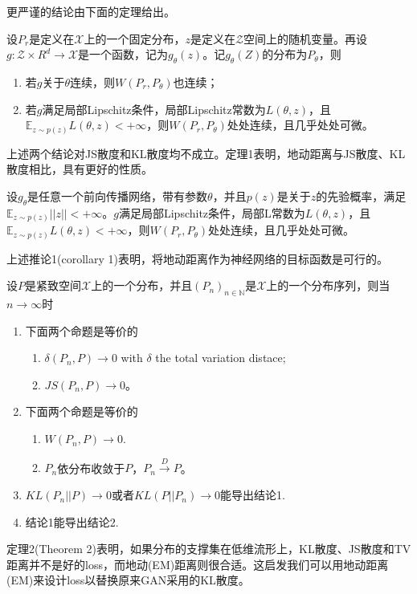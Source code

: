            更严谨的结论由下面的定理给出。
            \begin{theorem}[Theorem 1]
            设$P_r$是定义在$\mathcal{X}$上的一个固定分布，$z$是定义在$\mathcal{Z}$空间上的随机变量。再设$g:\mathcal{Z}\times R^d\to \mathcal{X}$是一个函数，记为$g_\theta(z)$。记$g_\theta(Z)$的分布为$P_\theta$，则
            \begin{enumerate}
            \item  若$g$关于$\theta$连续，则$W(P_r,P_\theta)$也连续；
            \item 若$g$满足局部Lipschitz条件，局部Lipschitz常数为$L(\theta,z)$，且$\mathbb{E}_{z\sim p(z)}L(\theta,z)< +\infty$，则$W(P_r,P_\theta)$处处连续，且几乎处处可微。
            \end{enumerate}
            \end{theorem}
            \par
            上述两个结论对JS散度和KL散度均不成立。定理1表明，地动距离与JS散度、KL散度相比，具有更好的性质。
            \begin{corollary}[corollary 1]
            设$g_\theta$是任意一个前向传播网络，带有参数$\theta$，并且$p(z)$是关于$z$的先验概率，满足$\mathbb{E}_{z\sim p(z)}||z|| < +\infty$。$g$满足局部Lipschitz条件，局部L常数为$L(\theta,z)$，且$\mathbb{E}_{z\sim p(z)}L(\theta,z)<+\infty$，则$W(P_r,P_\theta)$处处连续，且几乎处处可微。
            \end{corollary}
            \par
            上述推论1(corollary 1)表明，将地动距离作为神经网络的目标函数是可行的。
            \begin{theorem}[Theorem 2]
            设$P$是紧致空间$\mathcal{X}$上的一个分布，并且$(P_n)_{n\in \mathbb{N}}$是$\mathcal{X}$上的一个分布序列，则当$n\rightarrow \infty$时
            \begin{enumerate}
            \item 下面两个命题是等价的
            \begin{enumerate}
            \item $\delta(P_n,P)\to 0$ with $\delta$ the total variation distace;
            \item $JS(P_n,P)\to 0$。
            \end{enumerate}
            \item 下面两个命题是等价的
            \begin{enumerate}
            \item $W(P_n,P)\to 0$.
            \item $P_n$依分布收敛于$P$，$P_n\xrightarrow{D} P$。
            \end{enumerate}
            \item $KL(P_n||P)\to 0$或者$KL(P||P_n)\to 0$能导出结论1.
            \item 结论1能导出结论2.
            \end{enumerate}
            \end{theorem}
            \par
            定理2(Theorem 2)表明，如果分布的支撑集在低维流形上，KL散度、JS散度和TV距离并不是好的loss，而地动(EM)距离则很合适。这启发我们可以用地动距离(EM)来设计loss以替换原来GAN采用的KL散度。


